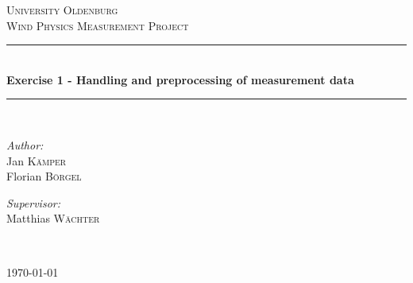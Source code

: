 \begin{titlepage}
\begin{center}


\textsc{\LARGE University Oldenburg}\\[1.5cm]

\textsc{\Large Wind Physics Measurement Project}\\[0.5cm]


\newcommand{\HRule}{\rule{\linewidth}{0.5mm}}
\HRule \\[0.4cm]
{ \huge \bfseries Exercise 1 - Handling and preprocessing of measurement data}\\[0.4cm]

\HRule \\[1.5cm]

\begin{minipage}{0.4\textwidth}
\begin{flushleft} \large
\emph{Author:}\\
Jan \textsc{K\"amper}\\
Florian \textsc{B\"orgel}
\end{flushleft}
\end{minipage}
\hfill
\begin{minipage}{0.4\textwidth}
\begin{flushright} \large
\emph{Supervisor:} \\
Matthias \textsc{Wächter}
\end{flushright}
\end{minipage}
\\[3cm]
\vfill



{\large \today}

\end{center}

\end{titlepage}